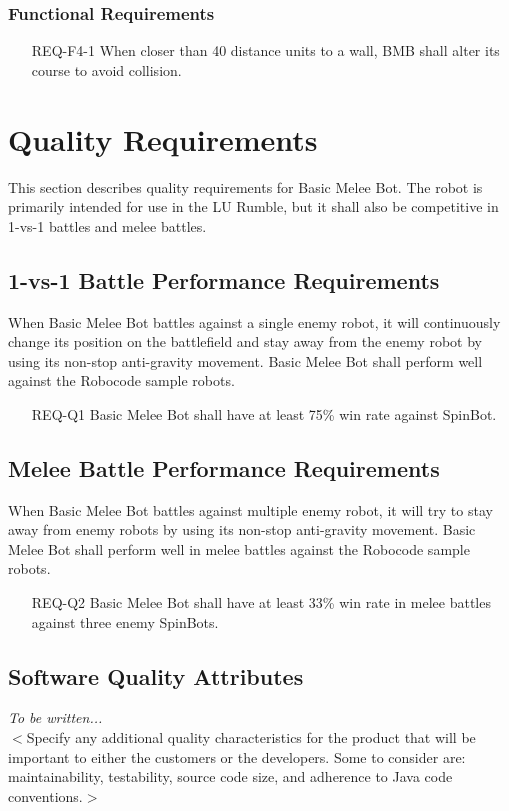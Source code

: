 \documentclass{scrreprt}
\begin{document}
\subsection{Functional Requirements}
\begin{itemize}
\item[REQ-F4-1] When closer than 40 distance units to a wall, BMB shall alter its course to avoid collision.
\end{itemize}

\chapter{Quality Requirements}
This section describes quality requirements for Basic Melee Bot. The robot is primarily intended for use in the LU Rumble, but it shall also be competitive in 1-vs-1 battles and melee battles.

\section{1-vs-1 Battle Performance Requirements}
When Basic Melee Bot battles against a single enemy robot, it will continuously change its position on the battlefield and stay away from the enemy robot by using its non-stop anti-gravity movement. Basic Melee Bot shall perform well against the Robocode sample robots.

\begin{itemize}
\item[REQ-Q1] Basic Melee Bot shall have at least 75\% win rate against SpinBot.
\end{itemize}

\section{Melee Battle Performance Requirements}
When Basic Melee Bot battles against multiple enemy robot, it will try to stay away from enemy robots by using its non-stop anti-gravity movement. Basic Melee Bot shall perform well in melee battles against the Robocode sample robots.

\begin{itemize}
\item[REQ-Q2] Basic Melee Bot shall have at least 33\% win rate in melee battles against three enemy SpinBots.
\end{itemize}

\section{Software Quality Attributes}
\textit{To be written...}\\
$<$Specify any additional quality characteristics for the product that will be important to either the customers or the developers. Some to consider are: maintainability, testability, source code size, and adherence to Java code conventions.$>$
\end{document}
